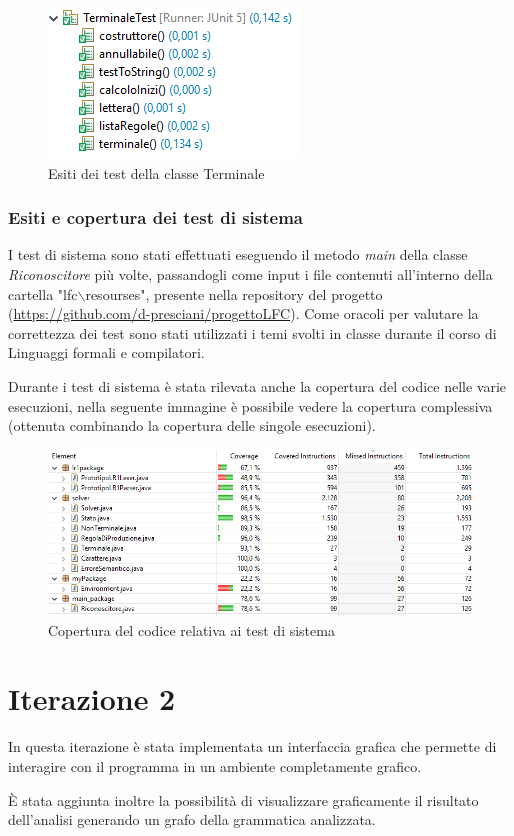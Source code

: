 \documentclass[12pt]{article}
\begin{document}
\begin{figure}[h]
\centering
\includegraphics[scale=0.9]{immagini/V1esitiTerminaleTest.png}
\caption{Esiti dei test della classe Terminale}
\end{figure}
\pagebreak

\subsubsection{Esiti e copertura dei test di sistema}
I test di sistema sono stati effettuati eseguendo il metodo \textit{main} della classe \textit{Riconoscitore} più volte, passandogli come input i file contenuti all'interno della cartella "lfc$\backslash$resourses", presente nella repository del progetto (\url{https://github.com/d-presciani/progettoLFC}). Come oracoli per valutare la correttezza dei test sono stati utilizzati i temi svolti in classe durante il corso di Linguaggi formali e compilatori. \par
Durante i test di sistema è stata rilevata anche la copertura del codice nelle varie esecuzioni, nella seguente immagine è possibile vedere la copertura complessiva (ottenuta combinando la copertura delle singole esecuzioni).
\begin{figure}[h]
\centering
\includegraphics[width=\textwidth]{immagini/V1codeCoverage.png}
\caption{Copertura del codice relativa ai test di sistema}
\end{figure}
\pagebreak

\section{Iterazione 2}
In questa iterazione è stata implementata un interfaccia grafica che permette di interagire con il programma in un ambiente completamente grafico.\par
È stata aggiunta inoltre la possibilità di visualizzare graficamente il risultato dell'analisi generando un grafo della grammatica analizzata.
\end{document}
